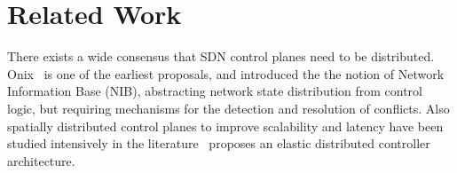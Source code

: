 \documentclass[conference]{sigcomm-alternate}
\begin{document}
\begin{comment}
However, reading each memory location is not enough, as the scheme requires to make a validation that involves multiple values. We utilize the metadata field in order to store all read values, in more details, each memory value $M_{i,j}$ is stored in offset i+j*n in the metadata field. Once all values are in the metadata field, we can detect the consensus winner by trying different matches on the metadata. Although we can have one match entry per possible matrix state, this solution requires exponential number of entries. A better way which we describe next requires only $O(n^2)$ entries utilizing n tables.

Our compact validation use additional temp variable, $temp_winner$, to hold the current best consensus candidate. Each of the n validating tables checks different "column" in the matrix and update $temp_winner$ to keep track of the winner so far (after examining a prefix sub set of the columns). The entry t in table k $(0<=k<n)$  matches the case where current winner=t and location $(t,k)$ in the matrix (packet header) equals 1 and location (k,k) is non-zero. After all validating tables are processed, $temp_winner$ stores the id of the winning server which can be used to match on its policy rules (filtering out other policies) or to use the goto table command to jump to a designated policy table of the server.


\section{The Practical Implementation}\label{sec:extension}

\end{comment}

\section{Related Work}\label{sec:relwork}

There exists a wide consensus that SDN control planes need to be distributed.~\cite{onos,onix,elasticon}
Onix~\cite{onix} is one of the earliest proposals, and introduced the
the notion of Network Information Base (NIB), abstracting network state
distribution from control logic, but
requiring mechanisms for the detection and resolution of conflicts.
Also spatially distributed control planes to improve scalability and
latency have been studied intensively
in the literature~\cite{kandoo,ctrl-place,hotsdn13loc}
proposes an elastic distributed controller architecture.
\end{document}
